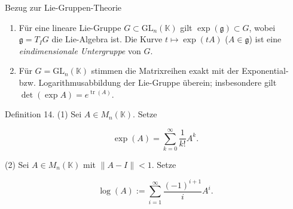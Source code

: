 \documentclass[10pt, letterpaper]{article}
\begin{document}
{Bezug zur Lie-Gruppen-Theorie}
\begin{enumerate}
\item Für eine lineare Lie-Gruppe $G \subset \mathrm{GL}_n(\mathbb{K})$ gilt $\exp(\mathfrak{g}) \subset G$, wobei $\mathfrak{g} = T_I G$ die Lie-Algebra ist. Die Kurve $t \mapsto \exp(tA)$ ($A \in \mathfrak{g}$) ist eine \emph{eindimensionale Untergruppe} von $G$.
\item Für $G = \mathrm{GL}_n(\mathbb{K})$ stimmen die Matrixreihen exakt mit der Exponential- bzw. Logarithmusabbildung der Lie-Gruppe überein; insbesondere gilt $\det(\exp A) = e^{\operatorname{tr}(A)}$.
\end{enumerate}






Definition 14. (1) Sei $A \in M_{n}(\mathbb{K})$. Setze

$$
\exp (A)=\sum_{k=0}^{\infty} \frac{1}{k!} A^{k} .
$$

(2) Sei $A \in M_{n}(\mathbb{K})$ mit $\|A-I\|<1$. Setze

$$
\log (A):=\sum_{i=1}^{\infty} \frac{(-1)^{i+1}}{i} A^{i} .
$$
\end{document}
